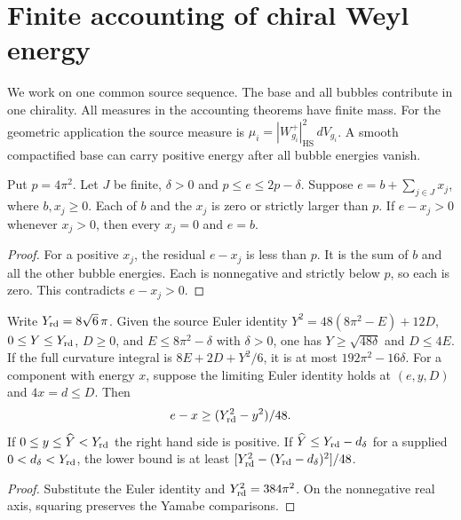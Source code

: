 \section{Finite accounting of chiral Weyl energy}

We work on one common source sequence. The base and all bubbles contribute
in one chirality. All measures in the accounting theorems have finite
mass. For the geometric application the source measure is
$\mu_i=|W^+_{g_i}|_{\mathrm{HS}}^2\,dV_{g_i}$. A smooth compactified
base can carry positive energy after all bubble energies vanish.

\begin{lemma}
\label{lem:finite-bubble-accounting}
\leanok
Put $p=4\pi^2$. Let $J$ be finite, $\delta>0$ and $p\le e\le2p-\delta$.
Suppose $e=b+\sum_{j\in J}x_j$, where $b,x_j\ge0$. Each of $b$ and
the $x_j$ is zero or strictly larger than $p$. If $e-x_j>0$ whenever
$x_j>0$, then every $x_j=0$ and $e=b$.
\end{lemma}
\begin{proof}
\leanok
For a positive $x_j$, the residual $e-x_j$ is less than $p$. It is
the sum of $b$ and all the other bubble energies. Each is nonnegative
and strictly below $p$, so each is zero. This contradicts $e-x_j>0$.
\end{proof}

\begin{lemma}
\label{lem:scalar-component-budgets}
\leanok
Write $Y_{\rm rd}=8\sqrt6\,\pi$. Given the source Euler identity
$Y^2=48(8\pi^2-E)+12D$, $0\le Y\le Y_{\rm rd}$, $D\ge0$,
and $E\le8\pi^2-\delta$ with $\delta>0$, one has $Y\ge\sqrt{48\delta}$
and $D\le4E$. If the full curvature integral is $8E+2D+Y^2/6$, it is
at most $192\pi^2-16\delta$. For a component with energy $x$, suppose
the limiting Euler identity holds at $(e,y,D)$ and $4x=d\le D$. Then
\[
 e-x\ge (Y_{\rm rd}^2-y^2)/48.
\]
If $0\le y\le\widehat Y<Y_{\rm rd}$ the right hand side is positive.
If $\widehat Y\le Y_{\rm rd}-d_\delta$ for a supplied
$0<d_\delta<Y_{\rm rd}$, the lower bound is at least
$[Y_{\rm rd}^2-(Y_{\rm rd}-d_\delta)^2]/48$.
\end{lemma}
\begin{proof}
\leanok
Substitute the Euler identity and $Y_{\rm rd}^2=384\pi^2$. On the
nonnegative real axis, squaring preserves the Yamabe comparisons.
\end{proof}

